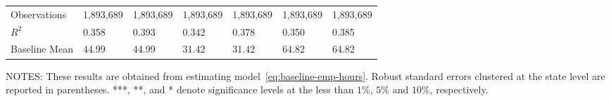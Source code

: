 \begin{table}[H]
{\begin{tabular}{@{}lllllll@{}}
            Observations        & 1,893,689 & 1,893,689 & 1,893,689 & 1,893,689 & 1,893,689 & 1,893,689 \\
            $R^2$               & 0.358     & 0.393     & 0.342     & 0.378     & 0.350     & 0.385     \\
            Baseline Mean       & 44.99     & 44.99     & 31.42     & 31.42     & 64.82     & 64.82     \\ \bottomrule \bottomrule
        \end{tabular}%
    }
    \begin{minipage}{\columnwidth}
        \vspace{0.05in}
        \tiny NOTES: These results are obtained from estimating model~\ref{eq:baseline-emp-hours}. Robust standard errors clustered at the state level are reported in parentheses. ***, **, and * denote significance levels at the less than $1\%$, $5\%$ and $10\%$, respectively.
    \end{minipage}
\end{table}